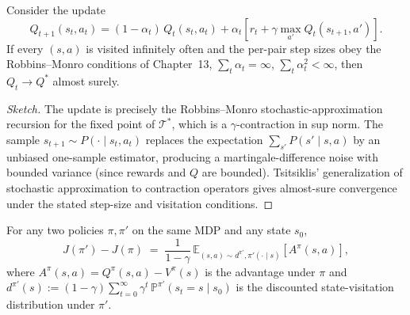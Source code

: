 \begin{theorem}
Consider the update
\[
Q_{t+1}(s_t,a_t) = (1-\alpha_t)\,Q_t(s_t,a_t) + \alpha_t\!\left[r_t + \gamma\max_{a'} Q_t(s_{t+1}, a')\right].
\]
If every $(s,a)$ is visited infinitely often and the per-pair step sizes obey the Robbins--Monro conditions of Chapter~13, $\sum_t \alpha_t = \infty$, $\sum_t \alpha_t^2 <\infty$, then $Q_t \to Q^*$ almost surely.
\end{theorem}

\begin{proof}[Sketch]
The update is precisely the Robbins--Monro stochastic-approximation recursion for the fixed point of $\mathcal{T}^*$, which is a $\gamma$-contraction in sup norm. The sample $s_{t+1}\sim P(\cdot\mid s_t,a_t)$ replaces the expectation $\sum_{s'} P(s'\mid s,a)$ by an unbiased one-sample estimator, producing a martingale-difference noise with bounded variance (since rewards and $Q$ are bounded). Tsitsiklis' generalization of stochastic approximation to contraction operators gives almost-sure convergence under the stated step-size and visitation conditions.
\end{proof}

\begin{lemma}
\label{lem:pdl}
For any two policies $\pi, \pi'$ on the same MDP and any state $s_0$,
\[
  J(\pi') - J(\pi) \;=\; \frac{1}{1 - \gamma}\, \mathbb{E}_{(s, a) \sim d^{\pi'}, \pi'(\cdot \mid s)}\!\left[ A^\pi(s, a) \right],
\]
where $A^\pi(s, a) = Q^\pi(s, a) - V^\pi(s)$ is the advantage under $\pi$ and $d^{\pi'}(s) := (1 - \gamma) \sum_{t=0}^\infty \gamma^t \, \mathbb{P}^{\pi'}(s_t = s \mid s_0)$ is the discounted state-visitation distribution under $\pi'$.
\end{lemma}

